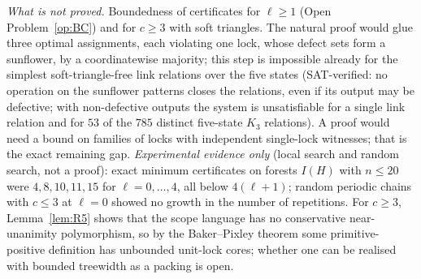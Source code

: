 \emph{What is not proved.} Boundedness of certificates for $\ell\ge1$ (Open Problem~\ref{op:BC}) and for $c\ge3$ with soft triangles. The natural proof would glue three optimal assignments, each violating one lock, whose defect sets form a sunflower, by a coordinatewise majority; this step is impossible already for the simplest soft-triangle-free link relations over the five states (SAT-verified: no operation on the sunflower patterns closes the relations, even if its output may be defective; with non-defective outputs the system is unsatisfiable for a single link relation and for $53$ of the $785$ distinct five-state $K_3$ relations). A proof would need a bound on families of locks with independent single-lock witnesses; that is the exact remaining gap. \emph{Experimental evidence only} (local search and random search, not a proof): exact minimum certificates on forests $I(H)$ with $n\le20$ were $4,8,10,11,15$ for $\ell=0,\dots,4$, all below $4(\ell+1)$; random periodic chains with $c\le3$ at $\ell=0$ showed no growth in the number of repetitions. For $c\ge3$, Lemma~\ref{lem:R5} shows that the scope language has no conservative near-unanimity polymorphism, so by the Baker--Pixley theorem some primitive-positive definition has unbounded unit-lock cores; whether one can be realised with bounded treewidth as a packing is open.
